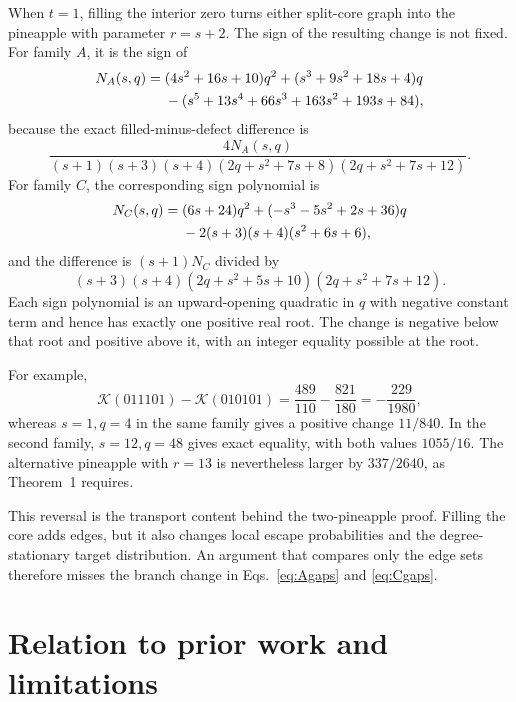 \documentclass[11pt]{article}
\newcommand{\K}{\mathcal{K}}
\begin{document}
When $t=1$, filling the interior zero turns either split-core graph into the
pineapple with parameter $r=s+2$.  The sign of the resulting change is not
fixed.  For family $A$, it is the sign of
\begin{align}
N_A(s,q)={}&(4s^2+16s+10)q^2+(s^3+9s^2+18s+4)q\notag\\
&-(s^5+13s^4+66s^3+163s^2+193s+84),
\label{eq:NA}
\end{align}
because the exact filled-minus-defect difference is
\begin{equation}
\frac{4N_A(s,q)}{(s+1)(s+3)(s+4)
(2q+s^2+7s+8)(2q+s^2+7s+12)}.
\label{eq:DAfill}
\end{equation}
For family $C$, the corresponding sign polynomial is
\begin{align}
N_C(s,q)={}&(6s+24)q^2+(-s^3-5s^2+2s+36)q\notag\\
&-2(s+3)(s+4)(s^2+6s+6),
\label{eq:NC}
\end{align}
and the difference is $(s+1)N_C$ divided by
\begin{equation}
(s+3)(s+4)(2q+s^2+5s+10)(2q+s^2+7s+12).
\end{equation}
Each sign polynomial is an upward-opening quadratic in $q$ with negative
constant term and hence has exactly one positive real root.  The change is
negative below that root and positive above it, with an integer equality
possible at the root.

For example,
\begin{equation}
 \K(011101)-\K(010101)
 =\frac{489}{110}-\frac{821}{180}=-\frac{229}{1980},
\end{equation}
whereas $s=1,q=4$ in the same family gives a positive change $11/840$.
In the second family, $s=12,q=48$ gives exact equality, with both values
$1055/16$.  The alternative pineapple with $r=13$ is nevertheless larger by
$337/2640$, as Theorem~1 requires.

This reversal is the transport content behind the two-pineapple proof.  Filling
the core adds edges, but it also changes local escape probabilities and the
degree-stationary target distribution.  An argument that compares only the
edge sets therefore misses the branch change in Eqs.~\eqref{eq:Agaps} and
\eqref{eq:Cgaps}.

\section{Relation to prior work and limitations}
\label{sec:related}
\end{document}
